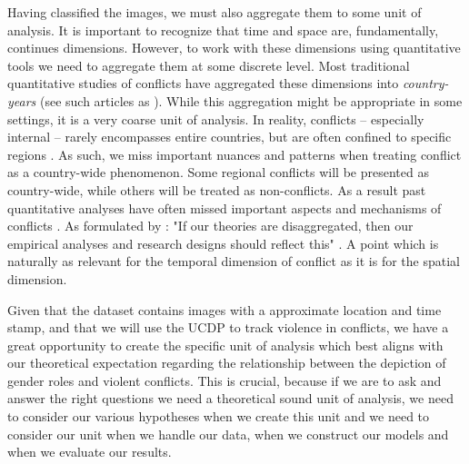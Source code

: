 \documentclass[a4paper]{article}
\begin{document}
Having classified the images, we must also aggregate them to some unit of analysis. It is important to recognize that time and space are, fundamentally, continues dimensions. However, to work with these dimensions using quantitative tools we need to aggregate them at some discrete level. Most traditional quantitative studies of conflicts have aggregated these dimensions into \emph{country-years} (see such articles as \cite{Collier_Hoeffler_1998, Fearon_Laitin_2003, Collier_Hoeffler_2004, Fearon_2004, Ross_2004, Fearon_2005, Hegre_Sambanis_2006, Goldstone_2010}). While this aggregation might be appropriate in some settings, it is a very coarse unit of analysis. In reality, conflicts -- especially internal -- rarely encompasses entire countries, but are often confined to specific regions \citep[487]{Cederman_Gleditsch_2009}. As such, we miss important nuances and patterns when treating conflict as a country-wide phenomenon. Some regional conflicts will be presented as country-wide, while others will be treated as non-conflicts. As a result past quantitative analyses have often missed important aspects and mechanisms of conflicts \citep{Cederman_Gleditsch_2009, Cederman_Gleditsch_Buhaug_2013}. As formulated by \cite{Cederman_Gleditsch_2009}: "If our theories are disaggregated, then our empirical analyses and research designs should reflect this" \citep[490]{Cederman_Gleditsch_2009}. A point which is naturally as relevant for the temporal dimension of conflict as it is for the spatial dimension.\par 

Given that the dataset contains images with a approximate location and time stamp, and that we will use the UCDP to track violence in conflicts, we have a great opportunity to create the specific unit of analysis which best aligns with our theoretical expectation regarding the relationship between the depiction of gender roles and violent conflicts. This is crucial, because if we are to ask and answer the right questions we need a theoretical sound unit of analysis, we need to consider our various hypotheses when we create this unit and we need to consider our unit when we handle our data, when we construct our models and when we evaluate our results.\par 
\end{document}
